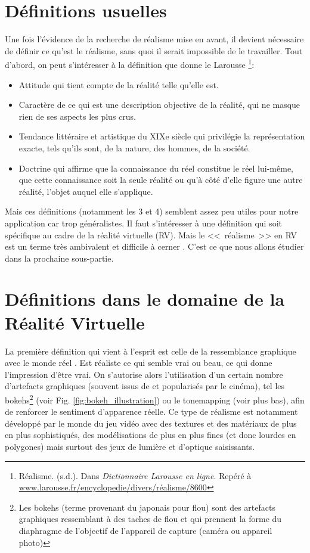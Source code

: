 	\section{Définitions usuelles}
	\par Une fois l'évidence de la recherche de réalisme mise en avant, il devient nécessaire de définir ce qu'est le réalisme, sans quoi il serait impossible de le travailler. Tout d'abord, on peut s'intéresser à la définition que donne le Larousse \footnote{Réalisme. (s.d.). Dans \textit{Dictionnaire Larousse en ligne}. Repéré à \url{www.larousse.fr/encyclopedie/divers/réalisme/8600}}:
	\begin{itemize}
		\item Attitude qui tient compte de la réalité telle qu'elle est.
		\item Caractère de ce qui est une description objective de la réalité, qui ne masque rien de ses aspects les plus crus.
		\item Tendance littéraire et artistique du XIXe siècle qui privilégie la représentation exacte, tels qu'ils sont, de la nature, des hommes, de la société.
		\item Doctrine qui affirme que la connaissance du réel constitue le réel lui-même, que cette connaissance soit la seule réalité ou qu'à côté d'elle figure une autre réalité, l'objet auquel elle s'applique.
	\end{itemize}
	
	\par Mais ces définitions (notamment les 3 et 4) semblent assez peu utiles pour notre application car trop généralistes. Il faut s'intéresser à une définition qui soit spécifique au cadre de la réalité virtuelle (RV). Mais le <<~réalisme~>> en RV est un terme très ambivalent et difficile à cerner \citep{burkhardt_realite_2003}. C'est ce que nous allons étudier dans la prochaine sous-partie.
	
	\section{Définitions dans le domaine de la Réalité Virtuelle}	
	\par La première définition qui vient à l'esprit est celle de la ressemblance graphique avec le monde réel \citep{ferwerda_model_1996}. Est réaliste ce qui semble vrai ou beau, ce qui donne l'impression d'être vrai. On s'autorise alors l'utilisation d'un certain nombre d'artefacts graphiques (souvent issus de et popularisés par le cinéma), tel les bokehs\footnote{Les bokehs (terme provenant du japonais pour flou) sont des artefacts graphiques ressemblant à des taches de flou et qui prennent la forme du diaphragme de l'objectif de l'appareil de capture (caméra ou appareil photo)} (voir Fig. \ref{fig:bokeh_illustration}) ou le tonemapping (voir plus bas), afin de renforcer le sentiment d'apparence réelle. Ce type de réalisme est notamment développé par le monde du jeu vidéo avec des textures et des matériaux de plus en plus sophistiqués, des modélisations de plus en plus fines (et donc lourdes en polygones) mais surtout des jeux de lumière et d'optique saisissants.
	

